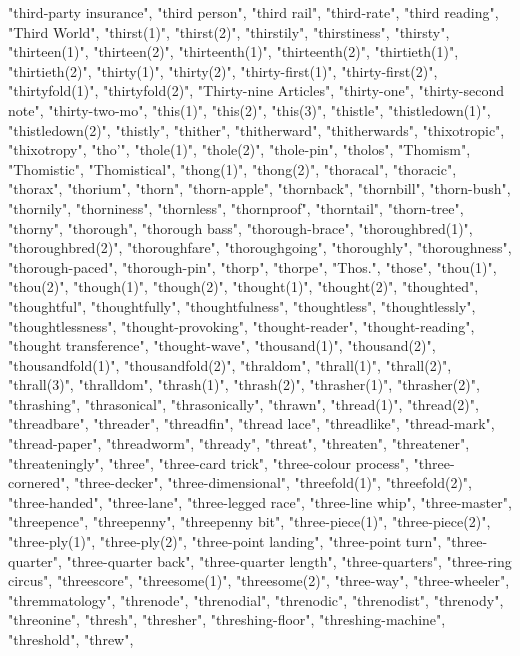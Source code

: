 "third-party insurance",
"third person",
"third rail",
"third-rate",
"third reading",
"Third World",
"thirst(1)",
"thirst(2)",
"thirstily",
"thirstiness",
"thirsty",
"thirteen(1)",
"thirteen(2)",
"thirteenth(1)",
"thirteenth(2)",
"thirtieth(1)",
"thirtieth(2)",
"thirty(1)",
"thirty(2)",
"thirty-first(1)",
"thirty-first(2)",
"thirtyfold(1)",
"thirtyfold(2)",
"Thirty-nine Articles",
"thirty-one",
"thirty-second note",
"thirty-two-mo",
"this(1)",
"this(2)",
"this(3)",
"thistle",
"thistledown(1)",
"thistledown(2)",
"thistly",
"thither",
"thitherward",
"thitherwards",
"thixotropic",
"thixotropy",
"tho'",
"thole(1)",
"thole(2)",
"thole-pin",
"tholos",
"Thomism",
"Thomistic",
"Thomistical",
"thong(1)",
"thong(2)",
"thoracal",
"thoracic",
"thorax",
"thorium",
"thorn",
"thorn-apple",
"thornback",
"thornbill",
"thorn-bush",
"thornily",
"thorniness",
"thornless",
"thornproof",
"thorntail",
"thorn-tree",
"thorny",
"thorough",
"thorough bass",
"thorough-brace",
"thoroughbred(1)",
"thoroughbred(2)",
"thoroughfare",
"thoroughgoing",
"thoroughly",
"thoroughness",
"thorough-paced",
"thorough-pin",
"thorp",
"thorpe",
"Thos.",
"those",
"thou(1)",
"thou(2)",
"though(1)",
"though(2)",
"thought(1)",
"thought(2)",
"thoughted",
"thoughtful",
"thoughtfully",
"thoughtfulness",
"thoughtless",
"thoughtlessly",
"thoughtlessness",
"thought-provoking",
"thought-reader",
"thought-reading",
"thought transference",
"thought-wave",
"thousand(1)",
"thousand(2)",
"thousandfold(1)",
"thousandfold(2)",
"thraldom",
"thrall(1)",
"thrall(2)",
"thrall(3)",
"thralldom",
"thrash(1)",
"thrash(2)",
"thrasher(1)",
"thrasher(2)",
"thrashing",
"thrasonical",
"thrasonically",
"thrawn",
"thread(1)",
"thread(2)",
"threadbare",
"threader",
"threadfin",
"thread lace",
"threadlike",
"thread-mark",
"thread-paper",
"threadworm",
"thready",
"threat",
"threaten",
"threatener",
"threateningly",
"three",
"three-card trick",
"three-colour process",
"three-cornered",
"three-decker",
"three-dimensional",
"threefold(1)",
"threefold(2)",
"three-handed",
"three-lane",
"three-legged race",
"three-line whip",
"three-master",
"threepence",
"threepenny",
"threepenny bit",
"three-piece(1)",
"three-piece(2)",
"three-ply(1)",
"three-ply(2)",
"three-point landing",
"three-point turn",
"three-quarter",
"three-quarter back",
"three-quarter length",
"three-quarters",
"three-ring circus",
"threescore",
"threesome(1)",
"threesome(2)",
"three-way",
"three-wheeler",
"thremmatology",
"threnode",
"threnodial",
"threnodic",
"threnodist",
"threnody",
"threonine",
"thresh",
"thresher",
"threshing-floor",
"threshing-machine",
"threshold",
"threw",
